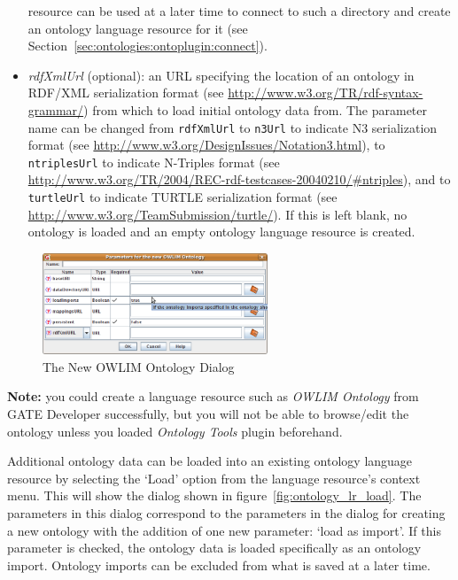 \begin{itemize}
  resource can be used at a later time to connect to such a directory and
  create an ontology language resource for it (see Section~\ref{sec:ontologies:ontoplugin:connect}).
  \item \emph{rdfXmlUrl} (optional): an URL specifying the location of an ontology in
  RDF/XML serialization format (see \url{http://www.w3.org/TR/rdf-syntax-grammar/}) from which
  to load initial ontology data from. The parameter name can be changed
  from \texttt{rdfXmlUrl} to \texttt{n3Url} to indicate N3 serialization
  format (see \url{http://www.w3.org/DesignIssues/Notation3.html}), 
  to \texttt{ntriplesUrl}  to indicate N-Triples format 
  (see \url{http://www.w3.org/TR/2004/REC-rdf-testcases-20040210/#ntriples}), 
  and to \texttt{turtleUrl} to indicate TURTLE serialization format
  (see \url{http://www.w3.org/TeamSubmission/turtle/}).
  If this is left blank, no ontology is loaded and an empty ontology
  language resource is created.
\end{itemize}


\begin{figure}[!htbp]
\begin{center}
\includegraphics[width=0.6\textwidth]{ontology_lrowlim_new.png}
\caption{The New OWLIM Ontology Dialog}
\label{fig:ontology_lrowlim_new}
\end{center}
\end{figure}

\textbf{Note:} you could create a language resource such as 
\emph{OWLIM Ontology} from GATE Developer successfully, but you 
will not be able to browse/edit the ontology unless you loaded 
\emph{Ontology Tools} plugin beforehand.

Additional ontology data can be loaded into an existing ontology
language resource by selecting the `Load' option from the 
language resource's context menu. This will show the 
dialog shown in figure~\ref{fig:ontology_lr_load}.
The parameters in this dialog correspond to the parameters in the 
dialog for creating a new ontology with the addition of one new
parameter: `load as import'. If this parameter is checked, the
ontology data is loaded specifically as an ontology import. Ontology
imports can be excluded from what is saved at a later time.

